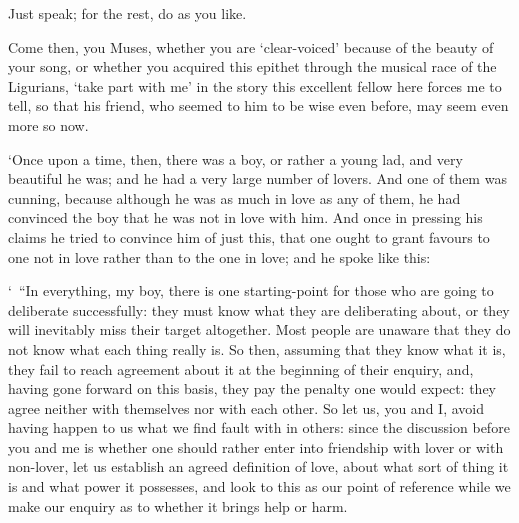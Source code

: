 Just speak; for the rest, do as you like.

Come then, you Muses, whether you are ‘clear-voiced' because of
the beauty of your song, or whether you acquired this epithet through
the musical race of the
Ligurians, 
‘take part with me' in
the story this excellent fellow here forces me to tell, so that his
friend, who seemed to him
to be  wise even before, may seem even more so now.

‘Once upon a time, then, there was a boy, or rather a young lad, and
very beautiful he was; and he had a very large number of lovers. And one
of them was cunning, because although he was as much in love as any of
them, he had convinced the boy that he was not in love with him. And
once in pressing his  claims he tried to convince him of just
this, that one ought to grant favours to one not in love rather than to
the one in love; and he spoke like this:

‘~“In everything, my boy, there is one starting-point for those who are
going to deliberate successfully: they must know what  they are
deliberating about, or they will inevitably miss their target
altogether. Most people are unaware that they do not know what each
thing really is. So then,
assuming that they know what it is, they fail to reach agreement about
it at the beginning of their enquiry, and, having gone forward on this
basis, they pay the penalty one would expect: they agree neither
 with themselves nor with each other. So let us, you and I,
avoid having happen to us what we find fault with in others: since the
discussion before you and me is whether one should rather enter into
friendship with lover or with non-lover, let us establish an agreed
definition of love, about what sort of thing it is  and what
power it possesses, and look to this as our point of reference while we
make our enquiry as to whether it brings help or harm.

